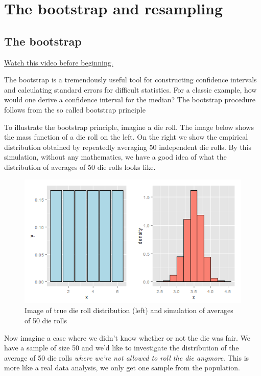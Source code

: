 \documentclass[]{article}
\begin{document}
\newpage

\section{The bootstrap and
resampling}\label{the-bootstrap-and-resampling}

\subsection{The bootstrap}\label{the-bootstrap}

\href{http://youtu.be/0hNQx9nagq4?list=PLpl-gQkQivXiBmGyzLrUjzsblmQsLtkzJ}{Watch
this video before beginning.}

The bootstrap is a tremendously useful tool for constructing confidence
intervals and calculating standard errors for difficult statistics. For
a classic example, how would one derive a confidence interval for the
median? The bootstrap procedure follows from the so called bootstrap
principle

To illustrate the bootstrap principle, imagine a die roll. The image
below shows the mass function of a die roll on the left. On the right we
show the empirical distribution obtained by repeatedly averaging 50
independent die rolls. By this simulation, without any mathematics, we
have a good idea of what the distribution of averages of 50 die rolls
looks like.

\begin{figure}[htbp]
\centering
\includegraphics{LeanPub/images/bootstrapping1-1.png}
\caption{Image of true die roll distribution (left) and simulation of
averages of 50 die rolls}
\end{figure}

Now imagine a case where we didn't know whether or not the die was fair.
We have a sample of size 50 and we'd like to investigate the
distribution of the average of 50 die rolls \emph{where we're not
allowed to roll the die anymore}. This is more like a real data
analysis, we only get one sample from the population.
\end{document}
